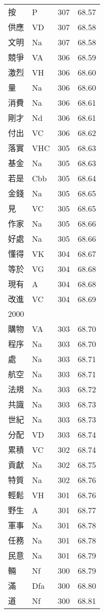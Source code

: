 \documentclass[twocolumn]{book}
\begin{document}
\begin{supertabular}{llrr}
按 & P & 307 &  68.57\\
供應 & VD & 307 &  68.58\\
文明 & Na & 307 &  68.58\\
競爭 & VA & 306 &  68.59\\
激烈 & VH & 306 &  68.60\\
量 & Na & 306 &  68.60\\
消費 & Na & 306 &  68.61\\
剛才 & Nd & 306 &  68.61\\
付出 & VC & 306 &  68.62\\
落實 & VHC & 305 &  68.63\\
基金 & Na & 305 &  68.63\\
若是 & Cbb & 305 &  68.64\\
金錢 & Na & 305 &  68.65\\
見 & VC & 305 &  68.65\\
作家 & Na & 305 &  68.66\\
好處 & Na & 305 &  68.66\\
懂得 & VK & 304 &  68.67\\
等於 & VG & 304 &  68.68\\
現有 & A & 304 &  68.68\\
改進 & VC & 304 &  68.69\\
2000\\
購物 & VA & 303 &  68.70\\
程序 & Na & 303 &  68.70\\
處 & Na & 303 &  68.71\\
航空 & Na & 303 &  68.71\\
法規 & Na & 303 &  68.72\\
共識 & Na & 303 &  68.73\\
世紀 & Na & 303 &  68.73\\
分配 & VD & 303 &  68.74\\
累積 & VC & 302 &  68.74\\
貢獻 & Na & 302 &  68.75\\
特質 & Na & 302 &  68.76\\
輕鬆 & VH & 301 &  68.76\\
野生 & A & 301 &  68.77\\
軍事 & Na & 301 &  68.78\\
任務 & Na & 301 &  68.78\\
民意 & Na & 301 &  68.79\\
輛 & Nf & 300 &  68.79\\
滿 & Dfa & 300 &  68.80\\
道 & Nf & 300 &  68.81\\

\end{supertabular}
\end{document}
